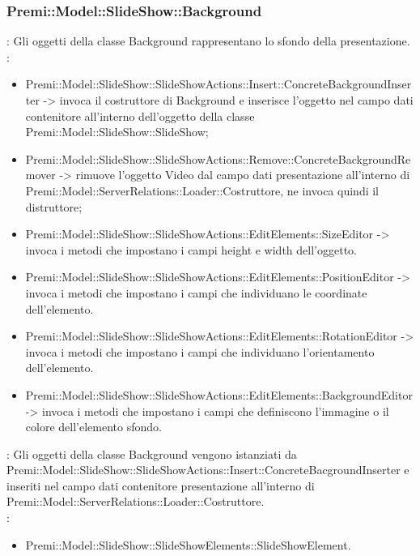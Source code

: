 {                 \subsubsection{Premi::Model::SlideShow::Background}{
                				\textbf{\tipo}: Gli oggetti della classe Background rappresentano lo sfondo della presentazione.\\
                				\textbf{\relaz}: 
                				\begin{itemize}
                					\item Premi::Model::SlideShow::SlideShowActions::Insert::ConcreteBackgroundInserter -> invoca il costruttore di Background e inserisce l’oggetto nel campo dati contenitore all’interno dell’oggetto della classe Premi::Model::SlideShow::SlideShow;
                                    \item Premi::Model::SlideShow::SlideShowActions::Remove::ConcreteBackgroundRemover -> rimuove l’oggetto Video dal campo dati presentazione all’interno di Premi::Model::ServerRelations::Loader::Costruttore, ne invoca quindi il distruttore;
                                    \item Premi::Model::SlideShow::SlideShowActions::EditElements::SizeEditor -> invoca i metodi che impostano i campi height e width dell'oggetto.
                    \item Premi::Model::SlideShow::SlideShowActions::EditElements::PositionEditor -> invoca i metodi che impostano i campi che individuano le coordinate dell'elemento.
                    \item Premi::Model::SlideShow::SlideShowActions::EditElements::RotationEditor -> invoca i metodi che impostano i campi che individuano l'orientamento dell'elemento.
                    \item Premi::Model::SlideShow::SlideShowActions::EditElements::BackgroundEditor -> invoca i metodi che impostano i campi che definiscono l'immagine o il colore dell'elemento sfondo.
                				\end{itemize}	
                                \textbf{\interfacce}: Gli oggetti della classe Background vengono istanziati da Premi::Model::SlideShow::SlideShowActions::Insert::ConcreteBacgroundInserter   e inseriti nel campo dati contenitore presentazione all’interno di Premi::Model::ServerRelations::Loader::Costruttore.\\
                                \textbf{\base}: 
                                    \begin{itemize}
                                    \item Premi::Model::SlideShow::SlideShowElements::SlideShowElement.
                                    \end{itemize}
                                    }              
}


